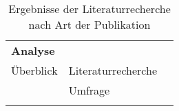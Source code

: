 \begin{longtable}{|p{}p{}p{}|}
    \\ \hline
    \textbf{Analyse} &  & \\
    Überblick                                                                       &
    Literaturrecherche                                                              &
        \cite{chazette_knowledge_nodate} \cite{sokol_explainability_2020} \cite{tintarev2015explaining} \cite{kohl_explainability_2019} \cite{rosenfeld_explainability_2019} \cite{cassens_ambient_2019} \cite{cirqueira_scenario-based_2020} \cite{rjoob_towards_2021} \cite{thomson_knowledge--information_2020} \cite{chari_explanation_2020} \cite{nunes_systematic_2017} \cite{sovrano_modelling_2020} \cite{ribera2019can} \cite{gunning2019darpa} \cite{doshi2017towards} \cite{lim_2009_assessing} \cite{tintarev2007survey}
        \\
                                                                                    &
    Umfrage                                                                         &
        \cite{brennen_what_2020} 
    \\ \hline
        
\caption{Ergebnisse der Literaturrecherche nach Art der Publikation}
\label{tab:paper_types}
\end{longtable}



